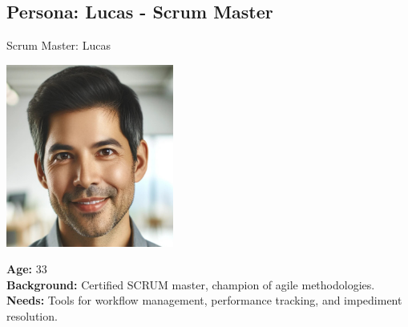 \subsection*{Persona: Lucas - Scrum Master}
\begin{persona}{Scrum Master: Lucas}
\begin{tcbraster}[raster columns=2, raster column skip=5mm]
  \begin{tcolorbox}[width=0.2\linewidth, colback=white, colframe=white, boxrule=0pt, halign=center]
   \includegraphics[width=\linewidth, height=6cm, keepaspectratio]{Images/Lucas.jpg}
  \end{tcolorbox}
  \begin{tcolorbox}[width=0.8\linewidth, colback=white, colframe=white, boxrule=0pt]
    \textbf{Age:} 33\\
    \textbf{Background:} Certified SCRUM master, champion of agile methodologies.\\
    \textbf{Needs:} Tools for workflow management, performance tracking, and impediment resolution.
  \end{tcolorbox}
\end{tcbraster}
\end{persona}

